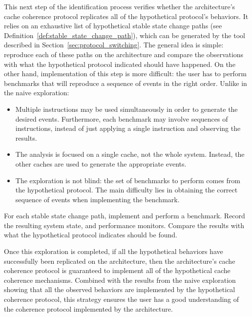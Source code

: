 This next step of the identification process verifies whether the architecture's
cache coherence protocol replicates all of the hypothetical protocol's
behaviors. It relies on an exhaustive list of hypothetical stable state change
paths (see Definition~\ref{def:stable_state_change_path}), which can be
generated by the tool described in Section~\ref{sec:protocol_switching}.  The
general idea is simple: reproduce each of these paths on the architecture and
compare the observations with what the hypothetical protocol indicated should
have happened. On the other hand, implementation of this step is more
difficult: the user has to perform benchmarks that will reproduce a sequence of
events in the right order. Unlike in the naive exploration:
\begin{itemize}
\item
   Multiple instructions may be used simultaneously in order to generate the
   desired events. Furthermore, each benchmark may involve sequences of
   instructions, instead of just applying a single instruction and observing the
   results.
\item
   The analysis is focused on a single cache, not the whole system. Instead, the
   other caches are used to generate the appropriate events.
\item
   The exploration is not blind: the set of benchmarks to perform comes from the
   hypothetical protocol. The main difficulty lies in obtaining the correct
   sequence of events when implementing the benchmark.
\end{itemize}

\begin{step}
\label{step:complex_behaviors_validation}
For each stable state change path, implement and perform a benchmark.
Record the resulting system state, and performance monitors. Compare the results
with what the hypothetical protocol indicates should be found.
\end{step}

Once this exploration is completed, if all the hypothetical behaviors have
successfully been replicated on the architecture, then the architecture's cache
coherence protocol is guaranteed to implement all of the hypothetical cache
coherence mechanisms. Combined with the results from the naive exploration
showing that all the observed behaviors are implemented by the hypothetical
coherence protocol, this strategy ensures the user has a good understanding of
the coherence protocol implemented by the architecture.


